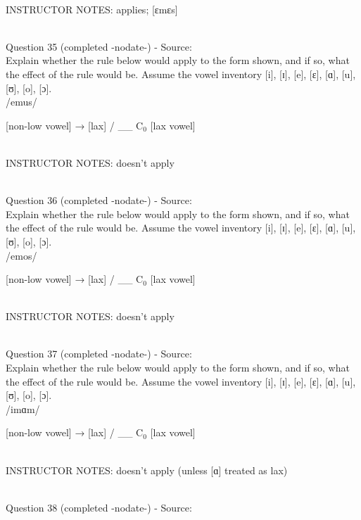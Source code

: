 \documentclass[12pt]{article}
\begin{document}
~\\
INSTRUCTOR NOTES: applies; [ɛmɛs]


~\\

{\large Question 35} (completed -nodate-) - Source: \\

Explain whether the rule below would apply to the form shown, and if so, what the effect of the rule would be. Assume the vowel inventory [i], [ɪ], [e], [ɛ], [ɑ], [u], [ʊ], [o], [ɔ].\\

/emus/

{[non-low vowel]} →  {[lax]} / \_\_ C$_0$ {[lax vowel]}


~\\
INSTRUCTOR NOTES: doesn't apply


~\\

{\large Question 36} (completed -nodate-) - Source: \\

Explain whether the rule below would apply to the form shown, and if so, what the effect of the rule would be. Assume the vowel inventory [i], [ɪ], [e], [ɛ], [ɑ], [u], [ʊ], [o], [ɔ].\\

/emos/

{[non-low vowel]} →  {[lax]} / \_\_ C$_0$ {[lax vowel]}


~\\
INSTRUCTOR NOTES: doesn't apply


~\\

{\large Question 37} (completed -nodate-) - Source: \\

Explain whether the rule below would apply to the form shown, and if so, what the effect of the rule would be. Assume the vowel inventory [i], [ɪ], [e], [ɛ], [ɑ], [u], [ʊ], [o], [ɔ].\\

/imɑm/

{[non-low vowel]} →  {[lax]} / \_\_ C$_0$ {[lax vowel]}


~\\
INSTRUCTOR NOTES: doesn't apply (unless [ɑ] treated as lax)


~\\

{\large Question 38} (completed -nodate-) - Source: \\
\end{document}
